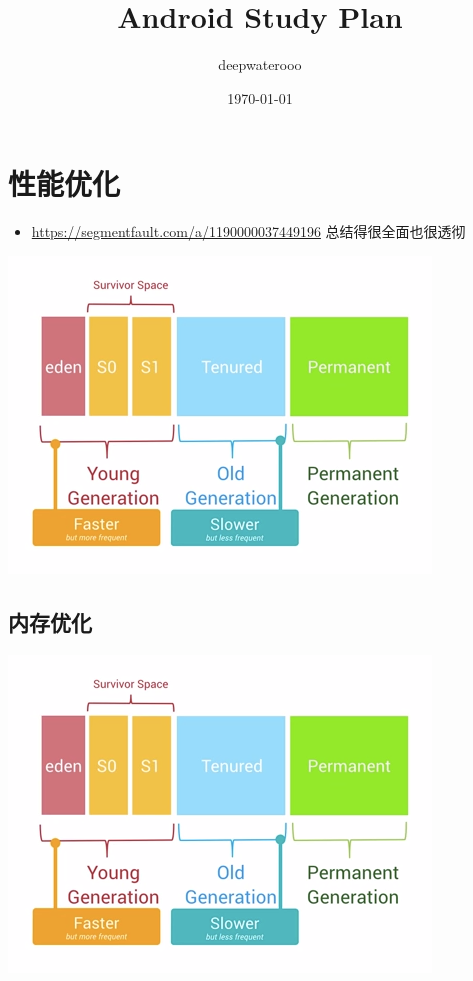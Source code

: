\documentclass[9pt, b5paper]{article}
\author{deepwaterooo}
\date{\today}
\title{Android Study Plan}
\begin{document}
\maketitle
\tableofcontents


\section{性能优化}
\label{sec-1}
\begin{itemize}
\item \url{https://segmentfault.com/a/1190000037449196} 总结得很全面也很透彻
\end{itemize}

\includegraphics[width=.9\linewidth]{./pic/ulti.png}

\subsection{内存优化}
\label{sec-1-1}

\includegraphics[width=.9\linewidth]{./pic/heapmodel.png}
\end{document}
